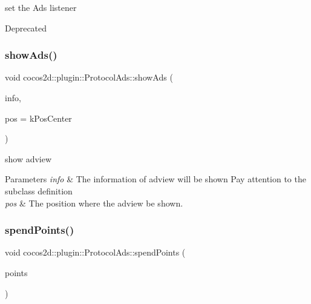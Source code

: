 set the Ads listener 

\begin{DoxyRefDesc}{Deprecated}
\item[\hyperlink{deprecated__deprecated000230}{Deprecated}]\end{DoxyRefDesc}
\mbox{\label{classcocos2d_1_1plugin_1_1ProtocolAds_ab645861aadce7f9736169e66bc30110e}} 
\subsubsection{\texorpdfstring{show\+Ads()}{showAds()}}
{\footnotesize\ttfamily void cocos2d\+::plugin\+::\+Protocol\+Ads\+::show\+Ads (\begin{DoxyParamCaption}\item[{T\+Ads\+Info}]{info,  }\item[{Ads\+Pos}]{pos = {\ttfamily kPosCenter} }\end{DoxyParamCaption})}



show adview 


\begin{DoxyParams}{Parameters}
{\em info} & The information of adview will be shown Pay attention to the subclass definition \\
\hline
{\em pos} & The position where the adview be shown. \\
\hline
\end{DoxyParams}
\mbox{\label{classcocos2d_1_1plugin_1_1ProtocolAds_afb4e3dc087a9cd9e3a4779198cb4a2da}} 
\subsubsection{\texorpdfstring{spend\+Points()}{spendPoints()}}
{\footnotesize\ttfamily void cocos2d\+::plugin\+::\+Protocol\+Ads\+::spend\+Points (\begin{DoxyParamCaption}\item[{int}]{points }\end{DoxyParamCaption})}



